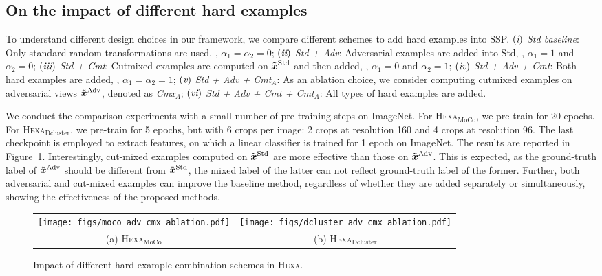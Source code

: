 \documentclass[10pt,twocolumn,letterpaper]{article}
\newcommand{\RN}[1]{\textup{\lowercase\expandafter{\it \romannumeral#1}}}
\newcommand{\xv}{\boldsymbol{x}}
\newcommand{\shortname}{\textsc{Hexa}}
\begin{document}
\subsection{On the impact of different hard examples}
To understand different design choices in our framework, we compare different schemes to add hard examples into SSP.
$(\RN{1})$ {\em Std baseline}: Only standard random transformations are used, \ie, $\alpha_1=\alpha_2=0$;
$(\RN{2})$ {\em Std + Adv}: Adversarial examples are added into Std, \ie, $\alpha_1\!=\!1$ and $\alpha_2\!=\!0$;
$(\RN{3})$ {\em Std + Cmt}: Cutmixed examples are computed on $\Tilde{\xv}^{\text{Std}}$ and then added, \ie, $\alpha_1\!=\!0$ and $\alpha_2\!=\!1$;
$(\RN{4})$ {\em Std + Adv + Cmt}: Both hard examples are added, \ie,  $\alpha_1=\alpha_2=1$;
$(\RN{5})$ {\em Std + Adv + Cmt$_A$}: As an ablation choice, we consider computing cutmixed examples on adversarial views $\Tilde{\xv}^{\text{Adv}}$, denoted as {\em Cmx}$_A$;
$(\RN{6})$ {\em Std + Adv + Cmt + Cmt$_A$}: All types of hard examples are added. 

We conduct the comparison experiments with a small number of pre-training steps on ImageNet. For \shortname{}$_{\text{MoCo}}$, we pre-train for 20 epochs. For \shortname{}$_{\text{Dcluster}}$, we pre-train for 5 epochs, but with 6 crops per image: 2 crops at resolution 160 and 4 crops at resolution 96. The last checkpoint is employed to extract features, on which a linear classifier is trained for 1 epoch on ImageNet. The results are reported in Figure~\ref{fig:hard_example_impact}. 
Interestingly, cut-mixed examples computed on $\Tilde{\xv}^{\text{Std}}$  are more effective than those on $\Tilde{\xv}^{\text{Adv}}$. This is expected, as the ground-truth label of $\Tilde{\xv}^{\text{Adv}}$ should be different from $\Tilde{\xv}^{\text{Std}}$, the mixed label of the latter can not reflect ground-truth label of the former. Further, both adversarial and cut-mixed examples can improve the baseline method, regardless of whether they are added separately or simultaneously, showing the effectiveness of the proposed methods.


\begin{figure}[t!]\vspace{-0mm}\centering
	\begin{tabular}{c c}
		\hspace{-3mm}
		\texttt{[image: figs/moco\_adv\_cmx\_ablation.pdf]}  & 
\hspace{-6mm}
		\texttt{[image: figs/dcluster\_adv\_cmx\_ablation.pdf]} \\
		(a) \shortname{}$_{\text{MoCo}}$ \vspace{2mm} & 
		(b) \shortname{}$_{\text{Dcluster}}$  \hspace{-0mm} \\ 
	\end{tabular}
	\vspace{-4mm}
	\caption{Impact of different hard example combination schemes in \shortname{}.
	 }
	\vspace{-4mm}
	\label{fig:hard_example_impact}
\end{figure}
\end{document}
